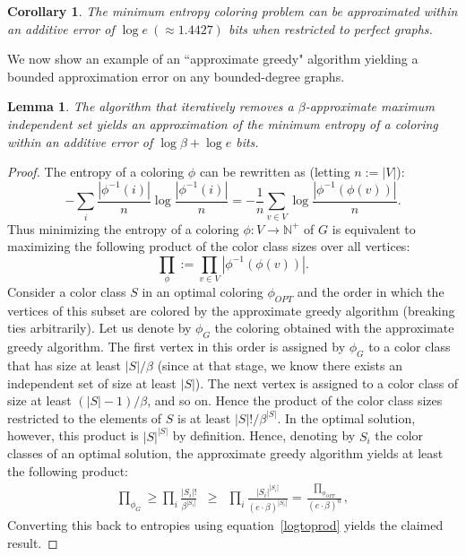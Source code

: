 \documentclass[10pt,a4paper]{article}
\newtheorem{lemma}{Lemma}
\newtheorem{corollary}{Corollary}
\begin{document}
\begin{corollary}
\label{cor:perfect_col}
The minimum entropy coloring problem can be approximated within an additive error of $\log e\ (\approx 1.4427)$ bits when restricted to perfect graphs.
\end{corollary}

We now show an example of an ``approximate greedy" algorithm yielding a bounded approximation error on any bounded-degree graphs. 

\begin{lemma}
\label{lem:beta-appx}
The algorithm that iteratively removes a $\beta$-approximate maximum independent set yields an approximation of the minimum entropy of a coloring within an additive error of $\log \beta + \log e$ bits.
\end{lemma}
\begin{proof}
The entropy of a coloring $\phi$ can be rewritten as (letting $n:=|V|$):
\begin{equation}
\label{logtoprod}
- \sum_i \frac{|\phi^{-1}(i)|}{n}  \log \frac{|\phi^{-1}(i)|}{n} = -\frac 1n \sum_{v\in V} \log \frac{|\phi^{-1}(\phi(v))|}{n} .
\end{equation}
Thus minimizing the entropy of a coloring $\phi : V\to \mathbb{N}^{+}$ of $G$ is equivalent to maximizing the following product of the color class sizes over all vertices:
$$
\prod_{\phi} := \prod_{v\in V} |\phi^{-1}(\phi (v))| .
$$
Consider a color class $S$ in an optimal coloring $\phi_{OPT}$ and the order in which the vertices of this subset are colored by the approximate greedy algorithm (breaking ties arbitrarily).
Let us denote by $\phi_G$ the coloring obtained with the approximate greedy algorithm.
The first vertex in this order is assigned by $\phi_G$ to a color class that has size at least $|S|/\beta$ (since at that stage, we know there exists an independent set of size at least $|S|$). 
The next vertex is assigned to a color class of size at least $(|S|-1)/\beta$, and so on.
Hence the product of the color class sizes restricted to the elements of $S$ is at least $|S|!/\beta^{|S|}$. 
In the optimal solution, however, this product is $|S|^{|S|}$ by definition. 
Hence, denoting by $S_i$ the color classes of an optimal solution, the approximate greedy algorithm yields at least the following product:
\begin{eqnarray}
\prod_{\phi_G}\geq \prod_i \frac{|S_i|!}{\beta^{|S_i|}} & \geq & \prod_i \frac{|S_i|^{|S_i|}}{(e\cdot \beta)^{|S_i|}} = \frac{\prod_{\phi_{OPT}}}{(e\cdot \beta)^n},
\end{eqnarray}
Converting this back to entropies using equation~\ref{logtoprod} yields the claimed result.
\end{proof}
\end{document}

